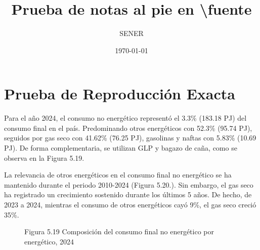 \documentclass{sener2025}
\title{Prueba de notas al pie en \textbackslash fuente}
\author{SENER}
\date{\today}
\begin{document}
\portadafondo

\section{Prueba de Reproducción Exacta}

Para el año 2024, el consumo no energético representó el 3.3\% (183.18 PJ) del consumo final en el país. Predominando otros energéticos con 52.3\% (95.74 PJ), seguidos por gas seco con 41.62\% (76.25 PJ), gasolinas y naftas con 5.83\% (10.69 PJ). De forma complementaria, se utilizan GLP y bagazo de caña, como se observa en la Figura 5.19.

La relevancia de otros energéticos en el consumo final no energético se ha mantenido durante el periodo 2010-2024 (Figura 5.20.). Sin embargo, el gas seco ha registrado un crecimiento sostenido durante los últimos 5 años. De hecho, de 2023 a 2024, mientras el consumo de otros energéticos cayó 9\%, el gas seco creció 35\%.

\begin{figure}[H]
  {\centering
  \par}
  \raggedright
  \caption{Figura 5.19 Composición del consumo final no energético por energético, 2024}
  \label{fig:figura_5_19_composicion_del_co}
\end{figure}
\vspace{-4pt}
\end{document}
